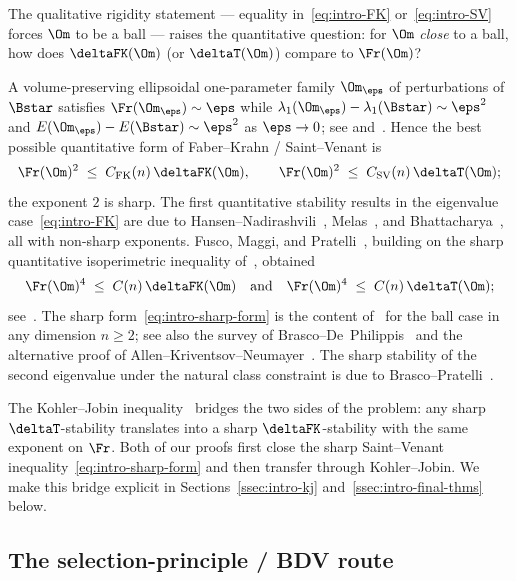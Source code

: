 The qualitative rigidity statement --- equality in~\eqref{eq:intro-FK}
or~\eqref{eq:intro-SV} forces $\Om$ to be a ball --- raises the
quantitative question: for $\Om$ \emph{close} to a ball, how does
$\deltaFK(\Om)$ (or $\deltaT(\Om)$) compare to $\Fr(\Om)$?

A volume-preserving ellipsoidal one-parameter family $\Om_\eps$ of
perturbations of $\Bstar$ satisfies $\Fr(\Om_\eps)\sim\eps$ while
$\lambda_1(\Om_\eps)-\lambda_1(\Bstar)\sim\eps^2$ and
$E(\Om_\eps)-E(\Bstar)\sim\eps^2$ as $\eps\to 0$; see
\cite[Introduction]{BraDeP2017} and~\cite[\S2]{BDV}. Hence the best
possible quantitative form of Faber--Krahn / Saint--Venant is
\begin{equation}\label{eq:intro-sharp-form}
   \Fr(\Om)^2\;\le\;C_{\rm FK}(n)\,\deltaFK(\Om),
   \qquad
   \Fr(\Om)^2\;\le\;C_{\rm SV}(n)\,\deltaT(\Om);
\end{equation}
the exponent $2$ is sharp. The first quantitative stability results
in the eigenvalue case~\eqref{eq:intro-FK} are due to
Hansen--Nadirashvili~\cite{HansenNadirashvili1994},
Melas~\cite{Melas1992}, and Bhattacharya~\cite{Bhattacharya2001},
all with non-sharp exponents. Fusco, Maggi, and
Pratelli~\cite{FMPLaplace}, building on the sharp quantitative
isoperimetric inequality of~\cite{FMP2008}, obtained
\begin{equation}\label{eq:intro-FMP-FK}
   \Fr(\Om)^4\;\le\;C(n)\,\deltaFK(\Om)
   \quad\text{and}\quad
   \Fr(\Om)^4\;\le\;C(n)\,\deltaT(\Om);
\end{equation}
see~\cite[Theorems~1.1, 1.4]{FMPLaplace}. The sharp
form~\eqref{eq:intro-sharp-form} is the content of~\cite{BDV} for the
ball case in any dimension $n\ge 2$; see also the survey of
Brasco--De~Philippis~\cite{BraDeP2017} and the alternative proof of
Allen--Kriventsov--Neumayer~\cite{AKN2023}. The sharp stability of
the second eigenvalue under the natural class constraint is due to
Brasco--Pratelli~\cite{BrascoPratelli2012}.

The Kohler--Jobin
inequality~\cite{KohlerJobin1978,Brasco2014} bridges the two sides of
the problem: any sharp $\deltaT$-stability translates into a sharp
$\deltaFK$-stability with the same exponent on $\Fr$. Both of our
proofs first close the sharp Saint--Venant
inequality~\eqref{eq:intro-sharp-form} and then transfer through
Kohler--Jobin. We make this bridge explicit in
Sections~\ref{ssec:intro-kj} and~\ref{ssec:intro-final-thms} below.

\subsection{The selection-principle / BDV route}
\label{ssec:intro-bdv}

